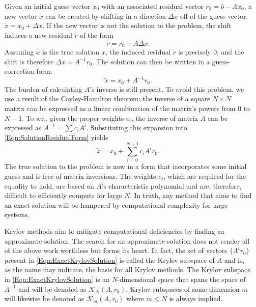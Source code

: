 \documentclass[Prelim,12pt]{WisconsinThesis}
\newcommand{\by}    {\!\times\!}
\newcommand{\dx}    {\ensuremath{\Delta{x}}}
\begin{document}
Given an initial guess vector $x_0$ with an associated residual vector $r_0 = b - A x_0$, a new vector $\tilde{x}$ can be created by shifting in a direction \dx{} off of the guess vector: $\tilde{x} = x_0 + \dx$.
If the new vector is not the solution to the problem, the shift induces a new residual $\tilde{r}$ of the form
\begin{equation}
    \tilde{r} = r_0  - A \dx.
    \label{Eqn:ResidualUpdateForm}
\end{equation}
Assuming $\tilde{x}$ is the true solution $x$, the induced residual $\tilde{r}$ is precisely $0$, and the shift is therefore $\dx = A^{-1}r_0$.
The solution can then be written in a guess-correction form:
\begin{equation}
    \tilde{x} = x_0 + A^{-1}r_0.
    \label{Eqn:SolutionResidualForm}
\end{equation}
The burden of calculating $A$'s inverse is still present.
To avoid this problem, we use a result of the Cayley-Hamilton theorem: the inverse of a square $N \by N$ matrix can be expressed as a linear combination of the matrix's powers from $0$ to $N-1$.
To wit, given the proper weights $c_i$, the inverse of matrix $A$ can be expressed as $A^{-1} = \sum c_i A^i$.
Substituting this expansion into \cref{Eqn:SolutionResidualForm} yields
\begin{equation}
    \tilde{x} = x_0 + \sum_{i = 0}^{N-1} c_i A^i r_0.
    \label{Eqn:ExactKrylovSolution}
\end{equation}
The true solution to the problem is now in a form that incorporates some initial guess and is free of matrix inversions.
The weights $c_i$, which are required for the equality to hold, are based on $A$'s characteristic polynomial and are, therefore, difficult to efficiently compute for large $N$.
In truth, any method that aims to find an exact solution will be hampered by computational complexity for large systems.



Krylov methods aim to mitigate computational deficiencies by finding an approximate solution.
The search for an approximate solution does not render all of the above work worthless but forms its heart.
In fact, the set of vectors $\{A^i r_0\}$ present in \cref{Eqn:ExactKrylovSolution} is called the Krylov subspace of $A$ and is, as the name may indicate, the basis for all Krylov methods.
The Krylov subspace in \cref{Eqn:ExactKrylovSolution} is an $N$-dimensional space that spans the space of $A^{-1}$ and will be denoted as $\mathcal{K}_{N}(A,r_0)$.
Krylov subspaces of some dimension $m$ will likewise be denoted as $\mathcal{K}_{m}(A,r_0)$ where $m \le N$ is always implied.
\end{document}
